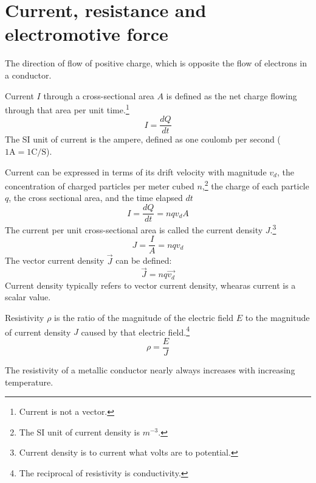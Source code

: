 \documentclass[nobib,notoc]{tufte-handout}
\begin{document}
\section{Current, resistance and electromotive force}
\begin{defi}
	The direction of flow of positive charge, which is opposite the flow of electrons in a conductor.
\end{defi}
\begin{defi}[Current]
	Current \(I\) through a cross-sectional area \(A\) is defined as the net charge flowing through that area per unit time.\footnote{Current is not a vector.}
	\begin{equation*}
		I=\frac{dQ}{dt}
	\end{equation*}
	The SI unit of current is the ampere, defined as one coulomb per second (\(1\text{A}=1\text{C}/\text{S}\)).
\end{defi}
\begin{rema}
	Current can be expressed in terms of its drift velocity with magnitude \(v_d\), the concentration of charged particles per meter cubed \(n\),\footnote{The SI unit of current density is \(m^{-3}\).} the charge of each particle \(q\), the cross sectional area, and the time elapsed \(dt\)
	\begin{equation*}
		I=\frac{dQ}{dt}=nqv_dA
	\end{equation*}
	The current per unit cross-sectional area is called the current density \(J\).\footnote{Current density is to current what volts are to potential.}
	\begin{equation*}
		J=\frac{I}{A}=nqv_d
	\end{equation*}
	The vector current density \(\vec{J}\) can be defined:
	\begin{equation*}
		\vec{J}=nq\vec{v_d}
	\end{equation*}
	Current density typically refers to vector current density, whearas current is a scalar value.
\end{rema}
\begin{defi}[Resistivity]
	Resistivity \(\rho\) is the ratio of the magnitude of the electric field \(E\) to the magnitude of current density \(J\) caused by that electric field.\footnote{The reciprocal of resistivity is conductivity.}
	\begin{equation*}
		\rho=\frac{E}{J}
	\end{equation*}
\end{defi}
\begin{rema}
	The resistivity of a metallic conductor nearly always increases with increasing temperature.
\end{rema}
\end{document}
